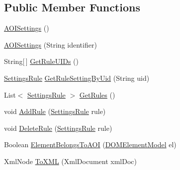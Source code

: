\subsection*{Public Member Functions}
\begin{DoxyCompactItemize}
\item 
\hyperlink{class_web_analyzer_1_1_models_1_1_settings_model_1_1_a_o_i_settings_acc73516628d0ab05d5a8f5b838407e2e}{A\+O\+I\+Settings} ()
\item 
\hyperlink{class_web_analyzer_1_1_models_1_1_settings_model_1_1_a_o_i_settings_a2d797a5be30a7909bcc9c74be10dea3c}{A\+O\+I\+Settings} (String identifier)
\item 
String\mbox{[}$\,$\mbox{]} \hyperlink{class_web_analyzer_1_1_models_1_1_settings_model_1_1_a_o_i_settings_a23e13f1b50742eb83541f1cabd2d87b2}{Get\+Rule\+U\+I\+Ds} ()
\item 
\hyperlink{class_web_analyzer_1_1_models_1_1_settings_model_1_1_settings_rule}{Settings\+Rule} \hyperlink{class_web_analyzer_1_1_models_1_1_settings_model_1_1_a_o_i_settings_aae020cd67c0393838d5009a26ca7f681}{Get\+Rule\+Setting\+By\+Uid} (String uid)
\item 
List$<$ \hyperlink{class_web_analyzer_1_1_models_1_1_settings_model_1_1_settings_rule}{Settings\+Rule} $>$ \hyperlink{class_web_analyzer_1_1_models_1_1_settings_model_1_1_a_o_i_settings_a1c6ceda7984e284a499445f7a95afb10}{Get\+Rules} ()
\item 
void \hyperlink{class_web_analyzer_1_1_models_1_1_settings_model_1_1_a_o_i_settings_a90d2d9b1f0a445bf8d9d59838eeaae86}{Add\+Rule} (\hyperlink{class_web_analyzer_1_1_models_1_1_settings_model_1_1_settings_rule}{Settings\+Rule} rule)
\item 
void \hyperlink{class_web_analyzer_1_1_models_1_1_settings_model_1_1_a_o_i_settings_a2e4c0faead8b85ebf0db0aaf6fe65699}{Delete\+Rule} (\hyperlink{class_web_analyzer_1_1_models_1_1_settings_model_1_1_settings_rule}{Settings\+Rule} rule)
\item 
Boolean \hyperlink{class_web_analyzer_1_1_models_1_1_settings_model_1_1_a_o_i_settings_aa2c30a095d9e8495a0ad2c0926130600}{Element\+Belongs\+To\+A\+O\+I} (\hyperlink{class_web_analyzer_1_1_models_1_1_data_model_1_1_d_o_m_element_model}{D\+O\+M\+Element\+Model} el)
\item 
Xml\+Node \hyperlink{class_web_analyzer_1_1_models_1_1_settings_model_1_1_a_o_i_settings_a964658ea49f4f1018ce45653e5f05ffd}{To\+X\+M\+L} (Xml\+Document xml\+Doc)
\end{DoxyCompactItemize}
